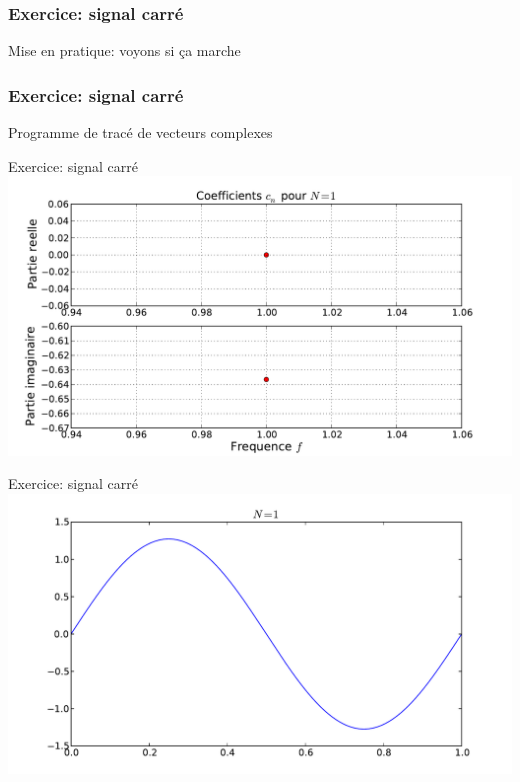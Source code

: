 \documentclass[8pt,a4paper]{beamer}
\begin{document}
\begin{frame}[containsverbatim]
  \frametitle{Exercice: signal carré}
\begin{block}{Mise en pratique: voyons si ça marche}

\end{block}
\end{frame}

\begin{frame}[containsverbatim]
  \frametitle{Exercice: signal carré}
\begin{block}{Programme de tracé de vecteurs complexes}

\end{block}
\end{frame}

\begin{frame}{Exercice: signal carré}
\includegraphics[width=1.\textwidth]{figures/serieF_carre_c_1.pdf} \\
\end{frame}

\begin{frame}{Exercice: signal carré}
\includegraphics[width=1.\textwidth]{figures/serieF_carre_1.pdf}\\
\end{frame}
\end{document}
